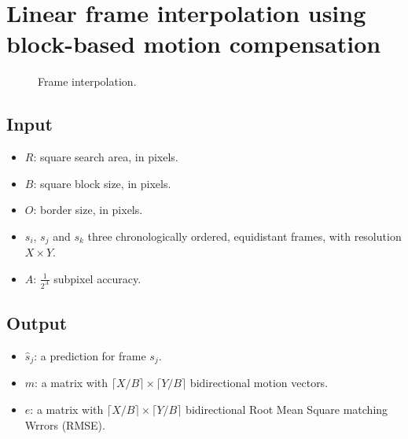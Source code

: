 \section{Linear frame interpolation using block-based motion compensation}
\label{sec:linear_frame_interpolation}
\begin{figure}[h]
  \caption{Frame interpolation.}
  \label{fig:frame_interpolation}
\end{figure}

\subsection*{Input}
\begin{itemize}
\tightlist
\item
  $R$: square search area, in pixels.
\item
  $B$: square block size, in pixels.
\item
  $O$: border size, in pixels.
\item
  $s_i$, $s_j$ and $s_k$ three chronologically ordered,
  equidistant frames, with resolution $X\times Y$.
\item
  $A$: $\frac{1}{2^A}$ subpixel accuracy.
\end{itemize}

\subsection*{Output}
\begin{itemize}
\tightlist
\item
  $\hat{s}_j$: a prediction for frame $s_j$.
\item
  $m$: a matrix with $\lceil X/B\rceil \times \lceil Y/B\rceil$
  bidirectional motion vectors.
\item
  $e$: a matrix with $\lceil X/B\rceil \times \lceil Y/B\rceil$
  bidirectional Root Mean Square matching Wrrors (RMSE).
\end{itemize}

